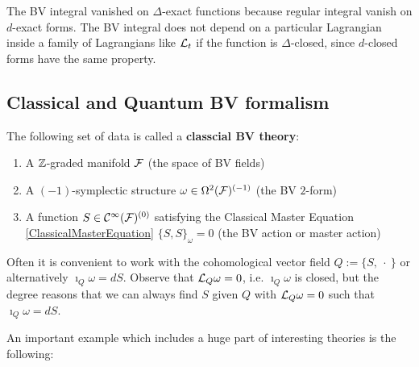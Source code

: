 The BV integral vanished on $\Delta$-exact functions because regular integral vanish on $d$-exact forms. The BV integral does not depend on a particular Lagrangian inside a family of Lagrangians like $\mathcal{L}_t$ if the function is $\Delta$-closed, since $d$-closed forms have the same property.

\subsection{Classical and Quantum BV formalism}

\begin{definition}[BV Theory]
  The following set of data is called a \textbf{classcial BV theory}:
  \begin{enumerate}
    \item A $\mathbb{Z}$-graded manifold ${\mathcal{F}}$ (the space of BV fields)
    \item A $(-1)$-symplectic structure $\omega \in \Omega^2({\mathcal{F}})^{(-1)}$ (the BV $2$-form)
    \item A function $S \in \mathcal{C}^{\infty}({\mathcal{F}})^{(0)}$ satisfying the Classical Master Equation \ref{ClassicalMasterEquation} $\{S, S\}_\omega = 0$ (the BV action or master action)
  \end{enumerate}
\end{definition}

\begin{rem}
  Often it is convenient to work with the cohomological vector field $Q := \{S, \ \cdot \ \}$ or alternatively $\imath_Q \omega = dS$. Observe that $\mathcal{L}_{Q} \omega = 0$, i.e. $\imath_Q \omega$ is closed, but the degree reasons that we can always find $S$ given $Q$ with $\mathcal{L}_{Q} \omega = 0$ such that $\imath_Q \omega = dS$.
\end{rem}

An important example which includes a huge part of interesting theories is the following:

